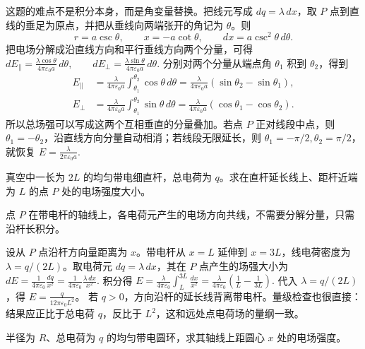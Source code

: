 \documentclass[lang=cn,11pt]{elegantbook}
\begin{document}
\begin{solution}
这题的难点不是积分本身，而是角变量替换。把线元写成 \(dq=\lambda\,dx\)，取 \(P\) 点到直线的垂足为原点，并把从垂线向两端张开的角记为 \(\theta\)。则
\[
r=a\csc\theta,\qquad x=-a\cot\theta,\qquad dx=a\csc^2\theta\,d\theta.
\]
把电场分解成沿直线方向和平行垂线方向两个分量，可得
 \(dE_\parallel=\frac{\lambda\cos\theta}{4\pi\varepsilon_0 a}\,d\theta, \qquad dE_\perp=\frac{\lambda\sin\theta}{4\pi\varepsilon_0 a}\,d\theta.\) 
分别对两个分量从端点角 \(\theta_1\) 积到 \(\theta_2\)，得到
\[
\begin{aligned}
E_\parallel
&=\frac{\lambda}{4\pi\varepsilon_0 a}
\int_{\theta_1}^{\theta_2}\cos\theta\,d\theta
=\frac{\lambda}{4\pi\varepsilon_0 a}
\left(\sin\theta_2-\sin\theta_1\right),\\
E_\perp
&=\frac{\lambda}{4\pi\varepsilon_0 a}
\int_{\theta_1}^{\theta_2}\sin\theta\,d\theta
=\frac{\lambda}{4\pi\varepsilon_0 a}
\left(\cos\theta_1-\cos\theta_2\right).
\end{aligned}
\]
所以总场强可以写成这两个互相垂直的分量叠加。若点 \(P\) 正对线段中点，则 \(\theta_1=-\theta_2\)，沿直线方向分量自动相消；若线段无限延长，则 \(\theta_1=-\pi/2,\theta_2=\pi/2\)，就恢复
 \(E=\frac{\lambda}{2\pi\varepsilon_0 a}.\) 
\end{solution}

\begin{exercise}
真空中一长为 \(2L\) 的均匀带电细直杆，总电荷为 \(q\)。求在直杆延长线上、距杆近端为 \(L\) 的点 \(P\) 处的电场强度大小。
\end{exercise}

\begin{solution}
点 \(P\) 在带电杆的轴线上，各电荷元产生的电场方向共线，不需要分解分量，只需沿杆长积分。

设从 \(P\) 点沿杆方向量距离为 \(x\)。带电杆从 \(x=L\) 延伸到 \(x=3L\)，线电荷密度为 \(\lambda=q/(2L)\)。取电荷元 \(dq=\lambda\,dx\)，其在 \(P\) 点产生的场强大小为
 \(dE=\frac{1}{4\pi\varepsilon_0}\frac{dq}{x^2} =\frac{1}{4\pi\varepsilon_0}\frac{\lambda\,dx}{x^2}.\) 
积分得
 \(E=\frac{\lambda}{4\pi\varepsilon_0} \int_L^{3L}\frac{dx}{x^2} =\frac{\lambda}{4\pi\varepsilon_0} \left(\frac{1}{L}-\frac{1}{3L}\right).\) 
代入 \(\lambda=q/(2L)\)，得 \(E=\frac{q}{12\pi\varepsilon_0 L^2}\)。
若 \(q>0\)，方向沿杆的延长线背离带电杆。量级检查也很直接：结果应正比于总电荷 \(q\)，反比于 \(L^2\)，这和远处点电荷场的量纲一致。
\end{solution}

\begin{exercise}[均匀带电圆环轴线上的场强]
半径为 \(R\)、总电荷为 \(q\) 的均匀带电圆环，求其轴线上距圆心 \(x\) 处的电场强度。
\end{exercise}
\end{document}
